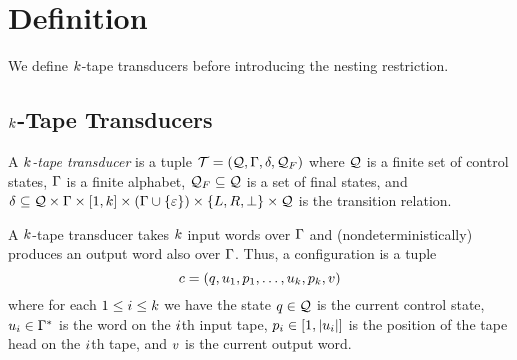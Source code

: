 
\section{Definition}

We define $k$-tape transducers before introducing the nesting restriction.


\subsection{$k$-Tape Transducers}

\begin{definition}
    A \emph{$k$-tape transducer} is a tuple
    $\mathcal{T} = \left(\mathcal{Q}, \Gamma, \delta, \mathcal{Q}_F\right)$
    where
        $\mathcal{Q}$ is a finite set of control states,
        $\Gamma$ is a finite alphabet,
        $\mathcal{Q}_F \subseteq \mathcal{Q}$ is a set of final states, and
        $\delta \subseteq
            \mathcal{Q} \times
            \Gamma \times [1, k] \times
            \left(\Gamma \cup \left\{\varepsilon\right\}\right) \times
            \left\{L, R, \bot\right\} \times \mathcal{Q}$
        is the transition relation.
\end{definition}

A $k$-tape transducer takes $k$ input words over $\Gamma$ and (nondeterministically) produces an output word also over $\Gamma$.
Thus, a configuration is a tuple
\[
    c =
    \left(
        q,
        u_1, p_1,
        \ldots,
        u_k, p_k,
        v
    \right)
\]
where for each
$1 \leq i \leq k$
we have
    the state $q \in \mathcal{Q}$ is the current control state,
    $u_i \in \Gamma^\ast$
        is the word on the $i$th input tape,
    $p_i \in [1, \left|u_i\right|]$
        is the position of the tape head on the $i$th tape, and
    $v$ is the current output word.

